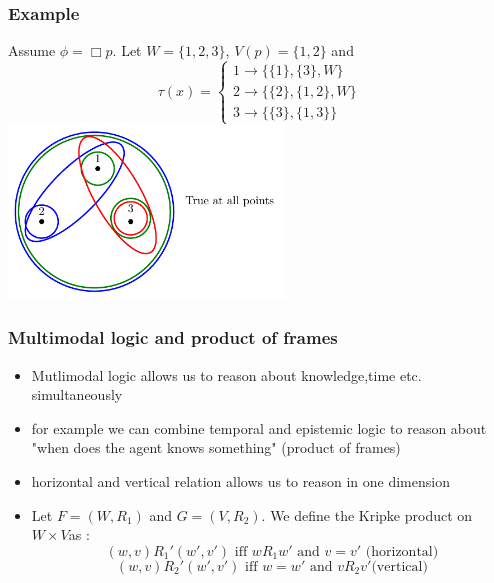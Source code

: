\documentclass[hyperref={pdfpagelabels=false},t,10pt]{beamer}
\begin{document}
\begin{frame}
  \frametitle{Example}
      Assume $\phi = \Box p$. Let $W = \{1,2,3\}$, $V(p) = \{1,2\}$ and 
    \[
            \tau(x) = 
            \begin{cases}
                1 \rightarrow \{\{1\}, \{3\}, W\} \\
                2 \rightarrow \{\{2\}, \{1,2\}, W\} \\
                3 \rightarrow \{\{3\}, \{1,3\}\}
            \end{cases}
    \] 
    \centering
      \includegraphics[width=0.55\textwidth]{Example3.pdf}
\end{frame}

\begin{frame}
  \frametitle{Multimodal logic and product of frames}
  \begin{itemize}
    \item Mutlimodal logic allows us to reason about knowledge,time etc. simultaneously 
    \item for example we can combine temporal and epistemic logic to reason about "when does the agent knows something" (product of frames) \pause
    \item horizontal and vertical relation allows us to reason in one dimension%
    \item Let $F = (W, R_1)$ and $G = (V, R_2)$. We define the Kripke product on $W \times V$as : 
      $$(w,v)R_1'(w',v') \mbox{ iff } wR_1w' \mbox{ and } v = v' \text{  (horizontal)}$$
      $$(w,v)R_2  '(w',v') \mbox{ iff } w = w' \mbox{ and } vR_2v' \text{(vertical)}$$
  \end{itemize}
\end{frame}
\end{document}

